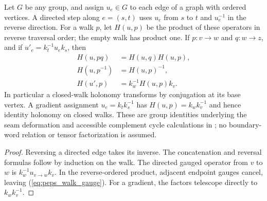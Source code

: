 \begin{lemma}%
    \label{thm:peps_regular_walk_holonomy}
    \leanok
    Let $G$ be any group, and assign $u_e\in G$ to each edge of a graph
    with ordered vertices. A directed step along $e=(s,t)$ uses $u_e$
    from $s$ to $t$ and $u_e^{-1}$ in the reverse direction. For a walk
    $p$, let $H(u,p)$ be the product of these operators in reverse
    traversal order; the empty walk has product one. If $p:v\to w$
    and $q:w\to z$, and if $u'_e=k_t^{-1}u_ek_s$, then
    \begin{align}
        H(u,pq)     & =H(u,q)H(u,p),      \\
        H(u,p^{-1}) & =H(u,p)^{-1},       \\
        H(u',p)     & =k_w^{-1}H(u,p)k_v.
        \label{eq:peps_walk_gauge}
    \end{align}
    In particular a closed-walk holonomy transforms by conjugation at
    its base vertex. A gradient assignment $u_e=k_tk_s^{-1}$ has
    $H(u,p)=k_wk_v^{-1}$ and hence identity holonomy on closed walks.
    These are group identities underlying the seam deformation and
    accessible complement cycle calculations in
    \cite[\S5.3 and Theorem~6.9]{Schuch2010PEPS}; no boundary-word
    relation or tensor factorization is assumed.
\end{lemma}

\begin{proof}\leanok
    Reversing a directed edge takes its inverse. The concatenation and
    reversal formulas follow by induction on the walk. The directed
    gauged operator from $v$ to $w$ is $k_w^{-1}u_{v\to w}k_v$.
    In the reverse-ordered product, adjacent endpoint gauges cancel,
    leaving (\ref{eq:peps_walk_gauge}). For a gradient, the factors
    telescope directly to $k_wk_v^{-1}$.
\end{proof}

